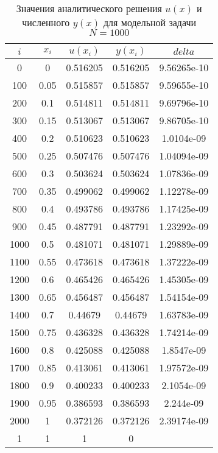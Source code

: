 \documentclass[a4paper,12pt,titlepage]{article}
\begin{document}
\begin{table}[h]
\centering
\begin{tabular}{|c|c|c|c|c|}
\hline
$i$ & $x_i$ & $u(x_i)$ & $y(x_i)$ & $delta$ \\
\hline
0&0&0.516205&0.516205&9.56265e-10\\
100&0.05&0.515857&0.515857&9.59655e-10\\
200&0.1&0.514811&0.514811&9.69796e-10\\
300&0.15&0.513067&0.513067&9.86705e-10\\
400&0.2&0.510623&0.510623&1.0104e-09\\
500&0.25&0.507476&0.507476&1.04094e-09\\
600&0.3&0.503624&0.503624&1.07836e-09\\
700&0.35&0.499062&0.499062&1.12278e-09\\
800&0.4&0.493786&0.493786&1.17425e-09\\
900&0.45&0.487791&0.487791&1.23292e-09\\
1000&0.5&0.481071&0.481071&1.29889e-09\\
1100&0.55&0.473618&0.473618&1.37222e-09\\
1200&0.6&0.465426&0.465426&1.45305e-09\\
1300&0.65&0.456487&0.456487&1.54154e-09\\
1400&0.7&0.44679&0.44679&1.63783e-09\\
1500&0.75&0.436328&0.436328&1.74214e-09\\
1600&0.8&0.425088&0.425088&1.8547e-09\\
1700&0.85&0.413061&0.413061&1.97572e-09\\
1800&0.9&0.400233&0.400233&2.1054e-09\\
1900&0.95&0.386593&0.386593&2.244e-09\\
2000&1&0.372126&0.372126&2.39174e-09\\
1&1&1&0\\
\hline
\end{tabular}
\caption{Значения аналитического решения $u(x)$ и численного $y(x)$ для модельной задачи $N=1000$}
\label{table}
\end{table}

\newpage
\end{document}
